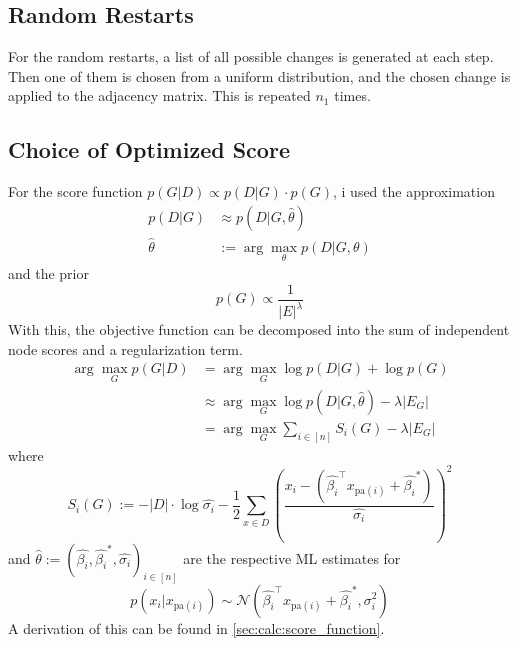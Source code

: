 \documentclass[sigconf, fleqn, prologue, dvipsnames]{acmart}
\newcommand{\abs}[1]{\left\vert #1 \right\vert}
\def\T{\top}
\def\pa{\text{pa}}
\begin{document}
\subsection{Random Restarts}
For the random restarts, a list of all possible changes is generated at each step.
Then one of them is chosen from a uniform distribution, and the chosen change is applied to the adjacency matrix.
This is repeated $n_1$ times.


\subsection{Choice of Optimized Score}
For the score function $p(G | D) \propto p(D | G) \cdot p(G)$, i used the approximation
\begin{align*}
	p(D | G)     & \approx p(D | G, \hat{\theta})               \\
	\hat{\theta} & := \arg\max\limits_{\theta} p(D | G, \theta)
\end{align*}
and the prior
$$p(G) \propto \frac{1}{|E|^\lambda}$$
With this, the objective function can be decomposed into the sum of independent node scores and a regularization term.
\begin{align*}
	\arg\max\limits_G p(G | D) & = \arg\max\limits_G \log p(D | G) + \log p(G)                             \\
	                           & \approx \arg\max\limits_G \log p(D | G, \hat{\theta}) - \lambda \abs{E_G} \\
	                           & = \arg\max\limits_G \sum\limits_{i \in [n]} S_i(G) - \lambda \abs{E_G}
\end{align*}
where
$$S_i(G) := -\abs{D} \cdot \log \hat{\sigma_i} - \frac{1}{2} \sum\limits_{x \in D} \left(\frac{x_i - (\hat{\beta_i}^\T x_{\pa(i)} + \hat{\beta_i}^*)}{\hat{\sigma_i}}\right)^2$$
and $\hat{\theta} := \left(\hat{\beta_i}, \hat{\beta_i}^*, \hat{\sigma_i}\right)_{i \in [n]}$ are the respective ML estimates for
$$p(x_i | x_{\pa(i)}) \sim \mathcal{N}(\hat{\beta_i}^\T x_{\pa(i)} + \hat{\beta_i}^*, \sigma_i^2)$$
A derivation of this can be found in \autoref{sec:calc:score_function}.
\end{document}
